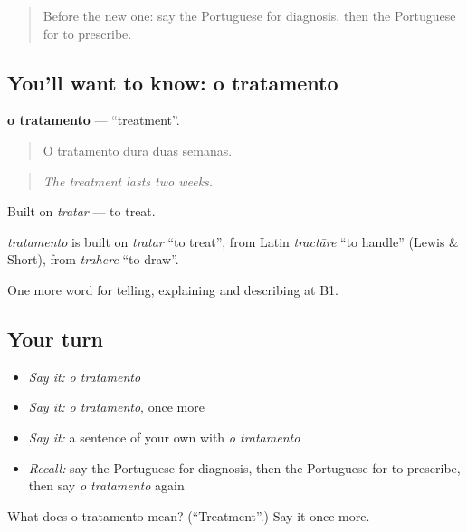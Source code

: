 \label{lesson:PT-C487-tratamento}



\begin{quote}
Before the new one: say the Portuguese for diagnosis, then the Portuguese for to prescribe.
\end{quote}

\subsection*{You'll want to know: o tratamento}
\textbf{o tratamento} — \textquotedblleft{}treatment\textquotedblright{}.

\begin{quote}
O tratamento dura duas semanas.
\end{quote}

\begin{quote}
\emph{The treatment lasts two weeks.}
\end{quote}

Built on \emph{tratar} — to treat.

\begin{cousinweb}
\emph{tratamento} is built on \emph{tratar} \textquotedblleft{}to treat\textquotedblright{}, from Latin \emph{tractāre} \textquotedblleft{}to handle\textquotedblright{} (Lewis \& Short), from \emph{trahere} \textquotedblleft{}to draw\textquotedblright{}.
\end{cousinweb}

\begin{grammarlens}[title={What you've built}]
One more word for telling, explaining and describing at B1.
\end{grammarlens}

\subsection*{Your turn}
\begin{itemize}
\raggedright
  \item \emph{Say it:} \emph{o tratamento}
  \item \emph{Say it:} \emph{o tratamento}, once more
  \item \emph{Say it:} a sentence of your own with \emph{o tratamento}
  \item \emph{Recall:} say the Portuguese for diagnosis, then the Portuguese for to prescribe, then say \emph{o tratamento} again
\end{itemize}

\begin{tcolorbox}[breakable,colback=teal!4,colframe=teal!35!black,title={Before you move on}]
What does o tratamento mean? (\textquotedblleft{}Treatment\textquotedblright{}.) Say it once more.
\end{tcolorbox}
